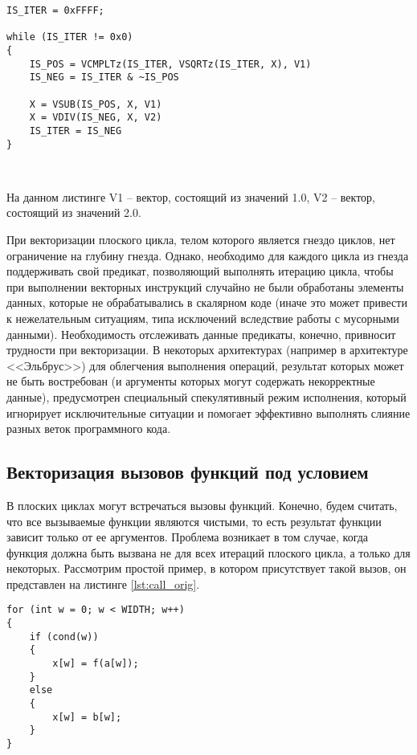 \documentclass[
11pt,%
tightenlines,%
twoside,%
onecolumn,%
nofloats,%
nobibnotes,%
nofootinbib,%
superscriptaddress,%
noshowpacs,%
centertags]%
{revtex4}
\begin{document}
\begin{lstlisting}[caption={Векторная форма плоского цикла, содержащего цикл с неконстантным числом итераций},label={lst:while_loop_vec}]
IS_ITER = 0xFFFF;

while (IS_ITER != 0x0)
{
    IS_POS = VCMPLTz(IS_ITER, VSQRTz(IS_ITER, X), V1)
    IS_NEG = IS_ITER & ~IS_POS
    
    X = VSUB(IS_POS, X, V1)
    X = VDIV(IS_NEG, X, V2)
    IS_ITER = IS_NEG
}
\end{lstlisting}

\

На данном листинге V1 -- вектор, состоящий из значений 1.0, V2 -- вектор, состоящий из значений 2.0.

При векторизации плоского цикла, телом которого является гнездо циклов, нет ограничение на глубину гнезда.
Однако, необходимо для каждого цикла из гнезда поддерживать свой предикат, позволяющий выполнять итерацию цикла, чтобы при выполнении векторных инструкций случайно не были обработаны элементы данных, которые не обрабатывались в скалярном коде (иначе это может привести к нежелательным ситуациям, типа исключений вследствие работы с мусорными данными).
Необходимость отслеживать данные предикаты, конечно, привносит трудности при векторизации.
В некоторых архитектурах (например в архитектуре <<Эльбрус>>) для облегчения выполнения операций, результат которых может не быть востребован (и аргументы которых могут содержать некорректные данные), предусмотрен специальный спекулятивный режим исполнения, который игнорирует исключительные ситуации и помогает эффективно выполнять слияние разных веток программного кода.

\subsection{Векторизация вызовов функций под условием}

В плоских циклах могут встречаться вызовы функций.
Конечно, будем считать, что все вызываемые функции являются чистыми, то есть результат функции зависит только от ее аргументов.
Проблема возникает в том случае, когда функция должна быть вызвана не для всех итераций плоского цикла, а только для некоторых.
Рассмотрим простой пример, в котором присутствует такой вызов, он представлен на листинге \ref{lst:call_orig}.

\begin{lstlisting}[caption={Пример плоского цикла с вызовом функции под условием},label={lst:call_orig}]
for (int w = 0; w < WIDTH; w++)
{
    if (cond(w))
    {
        x[w] = f(a[w]);
    }
    else
    {
        x[w] = b[w];
    }
}
\end{lstlisting}
\end{document}
